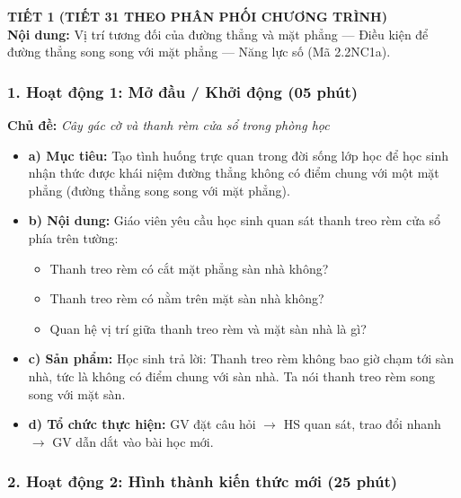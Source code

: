 \documentclass[12pt, a4paper]{article}
\begin{document}
{\large \textbf{TIẾT 1 (TIẾT 31 THEO PHÂN PHỐI CHƯƠNG TRÌNH)}}\\[0.3em]
\textbf{Nội dung:} Vị trí tương đối của đường thẳng và mặt phẳng --- Điều kiện để đường thẳng song song với mặt phẳng --- Năng lực số (Mã 2.2NC1a).

\subsubsection*{1. Hoạt động 1: Mở đầu / Khởi động (05 phút)}
\textbf{Chủ đề:} \textit{Cây gác cờ và thanh rèm cửa sổ trong phòng học}
\begin{itemize}
    \item \textbf{a) Mục tiêu:} Tạo tình huống trực quan trong đời sống lớp học để học sinh nhận thức được khái niệm đường thẳng không có điểm chung với một mặt phẳng (đường thẳng song song với mặt phẳng).
    \item \textbf{b) Nội dung:} Giáo viên yêu cầu học sinh quan sát thanh treo rèm cửa sổ phía trên tường:
    \begin{itemize}
        \item Thanh treo rèm có cắt mặt phẳng sàn nhà không?
        \item Thanh treo rèm có nằm trên mặt sàn nhà không?
        \item Quan hệ vị trí giữa thanh treo rèm và mặt sàn nhà là gì?
    \end{itemize}
    \item \textbf{c) Sản phẩm:} Học sinh trả lời: Thanh treo rèm không bao giờ chạm tới sàn nhà, tức là không có điểm chung với sàn nhà. Ta nói thanh treo rèm song song với mặt sàn.
    \item \textbf{d) Tổ chức thực hiện:} GV đặt câu hỏi $\to$ HS quan sát, trao đổi nhanh $\to$ GV dẫn dắt vào bài học mới.
\end{itemize}

\subsubsection*{2. Hoạt động 2: Hình thành kiến thức mới (25 phút)}
\end{document}
